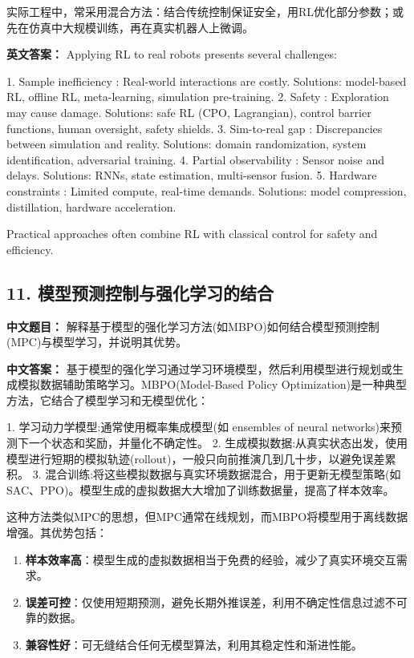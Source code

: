 \documentclass[10pt,a4paper]{ctexart}
\begin{document}
实际工程中，常采用混合方法：结合传统控制保证安全，用RL优化部分参数；或先在仿真中大规模训练，再在真实机器人上微调。

\textbf{英文答案：}  
Applying RL to real robots presents several challenges:

1.  Sample inefficiency : Real-world interactions are costly. Solutions: model-based RL, offline RL, meta-learning, simulation pre-training.
2.  Safety : Exploration may cause damage. Solutions: safe RL (CPO, Lagrangian), control barrier functions, human oversight, safety shields.
3.  Sim-to-real gap : Discrepancies between simulation and reality. Solutions: domain randomization, system identification, adversarial training.
4.  Partial observability : Sensor noise and delays. Solutions: RNNs, state estimation, multi-sensor fusion.
5.  Hardware constraints : Limited compute, real-time demands. Solutions: model compression, distillation, hardware acceleration.

Practical approaches often combine RL with classical control for safety and efficiency.

\subsection*{11. 模型预测控制与强化学习的结合}
\textbf{中文题目：} 解释基于模型的强化学习方法(如MBPO)如何结合模型预测控制(MPC)与模型学习，并说明其优势。

\textbf{中文答案：}  
基于模型的强化学习通过学习环境模型，然后利用模型进行规划或生成模拟数据辅助策略学习。MBPO(Model-Based Policy Optimization)是一种典型方法，它结合了模型学习和无模型优化：

1.  学习动力学模型:通常使用概率集成模型(如 ensembles of neural networks)来预测下一个状态和奖励，并量化不确定性。
2.  生成模拟数据:从真实状态出发，使用模型进行短期的模拟轨迹(rollout)，一般只向前推演几到几十步，以避免误差累积。
3.  混合训练:将这些模拟数据与真实环境数据混合，用于更新无模型策略(如SAC、PPO)。模型生成的虚拟数据大大增加了训练数据量，提高了样本效率。

这种方法类似MPC的思想，但MPC通常在线规划，而MBPO将模型用于离线数据增强。其优势包括：
\begin{enumerate}
    \item \textbf{样本效率高}：模型生成的虚拟数据相当于免费的经验，减少了真实环境交互需求。
    \item \textbf{误差可控}：仅使用短期预测，避免长期外推误差，利用不确定性信息过滤不可靠的数据。
    \item \textbf{兼容性好}：可无缝结合任何无模型算法，利用其稳定性和渐进性能。
\end{enumerate}
\end{document}
